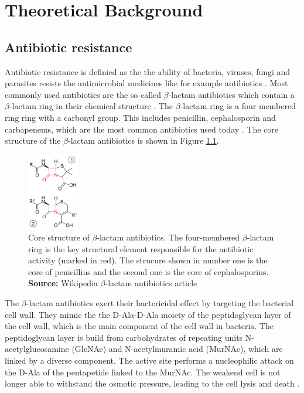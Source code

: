 \chapter{Theoretical Background}

\section{Antibiotic resistance}

Antibiotic resistance is definied as the the ability of bacteria, viruses, fungi and parasites resists the antimicrobial medicines like for example antibiotics \cite{who_antibiotic_resistance}. Most commonly used antibiotics are the so called $\beta$-lactam antibiotics which contain a $\beta$-lactam ring in their chemical structure \cite{bush2013}. The $\beta$-lactam ring is a four membered ring ring with a carbonyl group. This includes penicillin, cephalosporin and carbapenems, which are the most common antibiotics used today \cite{versporten2018}. The core structure of the $\beta$-lactam antibiotics is shown in Figure \ref{fig:beta_lactam_antibiotics}.

\begin{figure}[htbp]
    \centering
    \includegraphics[width=0.2\textwidth]{resources/images/beta_lactam_antibiotics_example.png}
    \caption{Core structure of $\beta$-lactam antibiotics. The four-membered $\beta$-lactam ring is the key structural element responsible for the antibiotic activity (marked in red). The strucure shown in number one is the core of penicillins and the second one is the core of cephalosporins. \textbf{Source:} Wikipedia $\beta$-lactam antibiotics article \cite{wikipedia_beta_lactam_antibiotics}}
    \label{fig:beta_lactam_antibiotics}
\end{figure}

The $\beta$-lactam antibiotics exert their bactericidal effect by targeting the bacterial cell wall. They mimic the the D-Ala-D-Ala moiety of the peptidoglycan layer of the cell wall, which is the main component of the cell wall in bacteria. The peptidoglycan layer is build from carbohydrates of repeating units N-acetylglucosamine (GlcNAc) and N-acetylmuramic acid (MurNAc), which are linked by a diverse component. The active site performs a nucleophilic attack on the D-Ala of the pentapetide linked to the MurNAc. The weakend cell is not longer able to withstand the osmotic pressure, leading to the cell lysis and death \cite{kim2023}.

